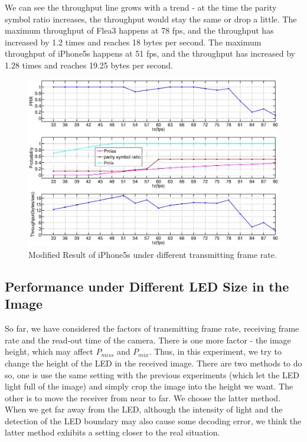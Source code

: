 We can see the throughput line grows with a trend - at the time the parity symbol ratio increases, the throughput would stay the same or drop a little. The maximum throughput of Flea3 happens at 78 fps, and the throughput has increased by 1.2 times and reaches 18 bytes per second. The maximum throughput of iPhone5s happens at 51 fps, and the throughput has increased by 1.28 times and reaches 19.25 bytes per second.

\begin{figure}[!htb] 
  \hspace{-2em}
  \includegraphics[scale=0.2]{fig/exp3_iphone5s_new_modify.eps}
  \caption{Modified Result of iPhone5s under different transmitting frame rate.}
  \label{fig:exp3_3}
\end{figure}

\subsection{Performance under Different LED Size in the Image}

So far, we have considered the factors of transmitting frame rate, receiving frame rate and the read-out time of the camera. There is one more factor - the image height, which may affect $P_{miss}$ and $P_{mix}$. Thus, in this experiment, we try to change the height of the LED in the received image.
There are two methods to do so, one is use the same setting with the previous experiments (which let the LED light full of the image) and simply crop the image into the height we want. The other is to move the receiver from near to far. We choose the latter method. When we get far away from the LED, although the intensity of light and the detection of the LED boundary may also cause some decoding error, we think the latter method exhibits a setting closer to the real situation. 

